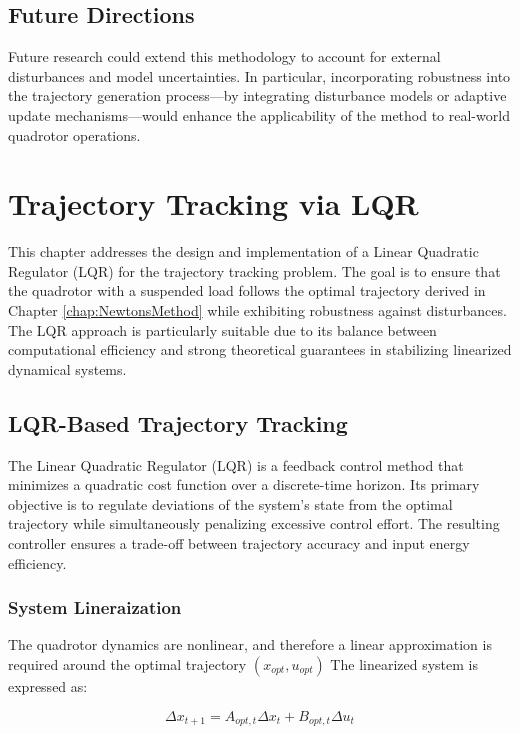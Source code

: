 \documentclass[a4paper,11pt,oneside]{book}
\begin{document}
\section{Future Directions}
Future research could extend this methodology to account for external disturbances and model uncertainties. In particular, incorporating robustness into the trajectory generation process—by integrating disturbance models or adaptive update mechanisms—would enhance the applicability of the method to real-world quadrotor operations.



\chapter{Trajectory Tracking via LQR}
\label{chap:Smooth_Trajectory}

This chapter addresses the design and implementation of a Linear Quadratic Regulator (LQR) for the trajectory tracking problem. The goal is to ensure that the quadrotor with a suspended load follows the optimal trajectory derived in Chapter \ref{chap:NewtonsMethod} while exhibiting robustness against disturbances. The LQR approach is particularly suitable due to its balance between computational efficiency and strong theoretical guarantees in stabilizing linearized dynamical systems.

\section{LQR-Based Trajectory Tracking}

The Linear Quadratic Regulator (LQR) is a feedback control method that minimizes a quadratic cost function over a discrete-time horizon. Its primary objective is to regulate deviations of the system’s state from the optimal trajectory while simultaneously penalizing excessive control effort. The resulting controller ensures a trade-off between trajectory accuracy and input energy efficiency.

\subsection{System Lineraization}
The quadrotor dynamics are nonlinear, and therefore a linear approximation is required around the optimal trajectory $(x_{opt}, u_{opt})$ The linearized system is expressed as:

\begin{equation}
\Delta x_{t+1} = A_{opt,t}\Delta x_t + B_{opt,t}\Delta u_t   
\label{eq:dynamics}
\end{equation}
\end{document}
